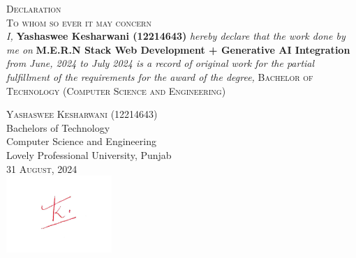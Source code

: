 \begin{titlepage}
    \centering
    \huge
    \textsc{Declaration}\\
    \vspace{0.5cm}
    \large
    \textsc{To whom so ever it may concern}\\
    \large
    \textit{I, }
    \textbf{Yashaswee Kesharwani (12214643)}
    \textit{hereby declare that the work done by me on}
    \textbf{M.E.R.N Stack Web Development + Generative AI Integration}
    \textit{from June, 2024 to July 2024  is a record of original work for the partial fulfillment of the requirements for the award of the degree, }
    \textsc{Bachelor of Technology (Computer Science and Engineering)}\\
    \vspace{1.5cm}
    \large
    \begin{flushleft}
    \textsc{Yashaswee Kesharwani (12214643)}\\
    Bachelors of Technology\\
    Computer Science and Engineering\\
    Lovely Professional University, Punjab\\
    \textsc{31 August, 2024}\\
    \includegraphics[width=0.3\textwidth]{assets/sign.jpg}\\
    \end{flushleft}
\end{titlepage}